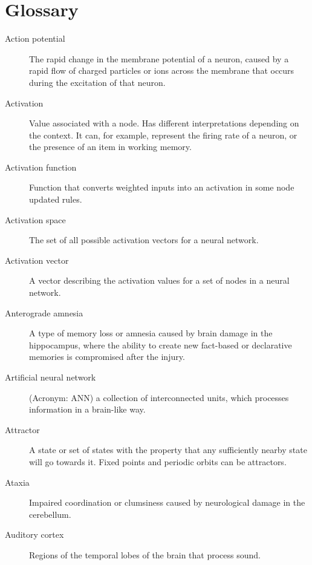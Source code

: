 \chapter{Glossary}

\begin{description}

\item[Action potential] The rapid change in the membrane potential of a neuron, caused by a rapid flow of charged particles or ions across the membrane that occurs during the excitation of that neuron.

\item[Activation] Value associated with a node. Has different interpretations depending on the context. It can, for example, represent the firing rate of a neuron, or the presence of an item in working memory.

\item[Activation function] Function that converts weighted inputs into an activation in some node updated rules.

\item[Activation space] The set of all possible activation vectors for a neural network.

\item[Activation vector] A vector describing the activation values for a set of nodes in a neural network.


\item[Anterograde amnesia] A type of memory loss or amnesia caused by brain damage in the hippocampus, where the ability to create new fact-based or declarative memories is compromised after the injury. 

\item[Artificial neural network] (Acronym: ANN) a collection of interconnected units, which processes information in a brain-like way.

\item[Attractor] A state or set of states with the property that any  sufficiently nearby state will go towards it. Fixed points and periodic orbits can be attractors.

\item[Ataxia] Impaired coordination or clumsiness caused by neurological damage in the cerebellum.

\item[Auditory cortex] Regions of the temporal lobes of the brain that process sound. 


\end{description}
